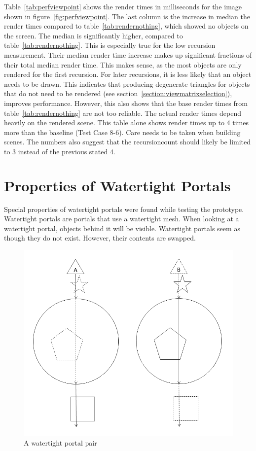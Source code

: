 Table~\ref{tab:perfviewpoint} shows the render times in milliseconds for the image shown in figure~\ref{fig:perfviewpoint}. The last column is the increase in median the render times compared to table~\ref{tab:rendernothing}, which showed no objects on the screen. The median is significantly higher, compared to table~\ref{tab:rendernothing}. This is especially true for the low recursion measurement. Their median render time increase makes up significant fractions of their total median render time. This makes sense, as the most objects are only rendered for the first recursion. For later recursions, it is less likely that an object needs to be drawn. This indicates that producing degenerate triangles for objects that do not need to be rendered (see section~\ref{section:viewmatrixselection}), improves performance. However, this also shows that the base render times from table~\ref{tab:rendernothing} are not too reliable. The actual render times depend heavily on the rendered scene. This table alone shows render times up to 4 times more than the baseline (Test Case 8-6). Care needs to be taken when building scenes. The numbers also suggest that the \gls{recursioncount} should likely be limited to 3 instead of the previous stated 4.


\section{Properties of Watertight Portals}
\label{section:watertight}
Special properties of watertight portals were found while testing the prototype. Watertight portals are portals that use a watertight mesh. When looking at a watertight portal, objects behind it will be visible. Watertight portals seem as though they do not exist. However, their contents are swapped.

\begin{figure}[h]
	\centering
	\includegraphics[width=0.8\linewidth]{images/watertight.png}
	\caption{A watertight portal pair}
	\label{fig:watertightportals}
\end{figure}

